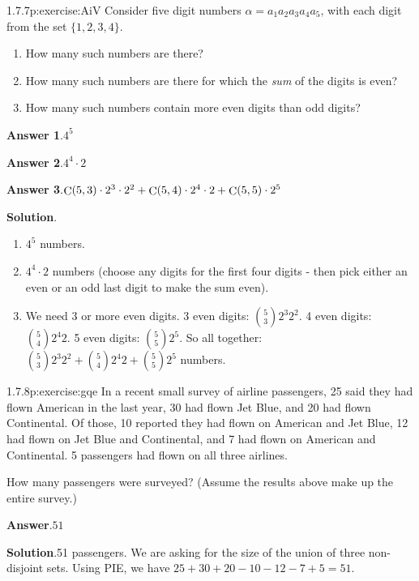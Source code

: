 \documentclass[twoside,11pt,]{book}
\newcommand{\blocktitlefont}{\relax}
\numberwithin{equation}{chapter}
\begin{document}
\begin{divisionsolution}{1.7.7}{}{p:exercise:AiV}%
Consider five digit numbers \(\alpha = a_1a_2a_3a_4a_5\text{,}\) with each digit from the set \(\{1,2,3,4\}\text{.}\)%
\begin{enumerate}[label=(\alph*)]
\item{}How many such numbers are there?%
\item{}How many such numbers are there for which the \emph{sum} of the digits is even?%
\item{}How many such numbers contain more even digits than odd digits?%
\end{enumerate}
%
\par\smallskip%
\noindent\textbf{\blocktitlefont Answer 1}.\quad{}\(4^{5}\)%
\par\smallskip%
\noindent\textbf{\blocktitlefont Answer 2}.\quad{}\(4^{4}\cdot 2\)%
\par\smallskip%
\noindent\textbf{\blocktitlefont Answer 3}.\quad{}\(\mathop{\rm C}\nolimits\!\left(5,3\right)\cdot 2^{3}\cdot 2^{2}+\mathop{\rm C}\nolimits\!\left(5,4\right)\cdot 2^{4}\cdot 2+\mathop{\rm C}\nolimits\!\left(5,5\right)\cdot 2^{5}\)%
\par\smallskip%
\noindent\textbf{\blocktitlefont Solution}.\quad{}%
\begin{enumerate}[label=(\alph*)]
\item{}\(4^5\) numbers.%
\item{}\(4^4\cdot 2\) numbers (choose any digits for the first four digits - then pick either an even or an odd last digit to make the sum even).%
\item{}We need 3 or more even digits. 3 even digits: \({5 \choose 3}2^3 2^2\text{.}\) 4 even digits: \({5 \choose 4}2^4 2\text{.}\) 5 even digits: \({5 \choose 5}2^5\text{.}\) So all together: \({5 \choose 3}2^3 2^2 + {5 \choose 4}2^4 2 + {5 \choose 5}2^5\) numbers.%
\end{enumerate}
%
\end{divisionsolution}%
\begin{divisionsolution}{1.7.8}{}{p:exercise:gqe}%
In a recent small survey of airline passengers, 25 said they had flown American in the last year, 30 had flown Jet Blue, and 20 had flown Continental. Of those, 10 reported they had flown on American and Jet Blue, 12 had flown on Jet Blue and Continental, and 7 had flown on American and Continental. 5 passengers had flown on all three airlines.%
\par
How many passengers were surveyed? (Assume the results above make up the entire survey.)%
\par\smallskip%
\noindent\textbf{\blocktitlefont Answer}.\quad{}\(51\)%
\par\smallskip%
\noindent\textbf{\blocktitlefont Solution}.\quad{}51 passengers. We are asking for the size of the union of three non-disjoint sets. Using PIE, we have \(25+30+20-10 -12-7+5 = 51\text{.}\)%
\end{divisionsolution}%
\end{document}
